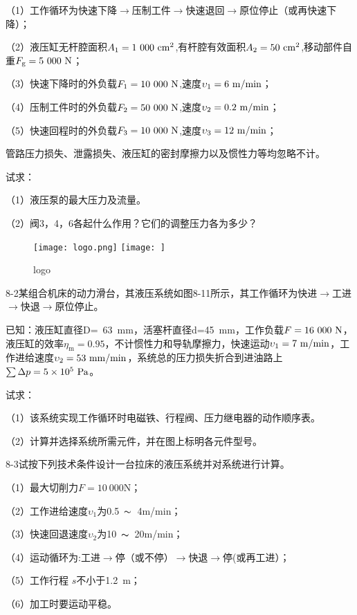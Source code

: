 \documentclass[cn,11pt,chinese]{elegantbook}
\begin{document}
（1）工作循环为快速下降$\rightarrow $压制工件$\rightarrow $快速退回$\rightarrow $原位停止（或再快速下降）；

（2）液压缸无杆腔面积$A_\text{1}=1\ 000\ \rm cm^2$,有杆腔有效面积$A_\text{2}=50\ \rm cm^2$,移动部件自重$F_\text{g}=5\ 000\ \rm N$；

（3）快速下降时的外负载$F_\text{1}=10\ 000\ \rm N$,速度$\upsilon_\text{1}=6\ \rm m/min$；

（4）压制工件时的外负载$F_\text{2}=50\ 000\ \rm N$,速度$\upsilon_\text{2}=0.2\ \rm m/min$；

（5）快速回程时的外负载$F_\text{3}=10\ 000\ \rm N$,速度$\upsilon_\text{3}=12\ \rm m/min$；

管路压力损失、泄露损失、液压缸的密封摩擦力以及惯性力等均忽略不计。

试求：

（1）液压泵的最大压力及流量。

（2）阀3，4，6各起什么作用？它们的调整压力各为多少？
\begin{figure}
\centering
\ifopensource
\texttt{[image: logo.png]}
\else
\texttt{[image: ]}
\fi
\caption{logo}
\label{}
\end{figure}
8-2\qquad 某组合机床的动力滑台，其液压系统如图8-11所示，其工作循环为快进$\rightarrow $工进$\rightarrow $快退$\rightarrow $原位停止。

已知：液压缸直径D=\ 63\ mm，活塞杆直径d=45\ mm，工作负载$F=16\ 000\ \rm N$，液压缸的效率$\eta_\text{m}=0.95$，不计惯性力和导轨摩擦力，快速运动$\upsilon_\text{1}=7\ \rm m/min$，工作进给速度$\upsilon_\text{2}=53\ \rm mm/min$，系统总的压力损失折合到进油路上$\sum \Delta p=5\times10^5\ \rm Pa$。

试求：

（1）该系统实现工作循环时电磁铁、行程阀、压力继电器的动作顺序表。

（2）计算并选择系统所需元件，并在图上标明各元件型号。

8-3\qquad 试按下列技术条件设计一台拉床的液压系统并对系统进行计算。

（1）最大切削力$F=10\ 000$N；

（2）工作进给速度$\upsilon_\text{1}$为0.5\ $\thicksim$\ 4m/min；

（3）快速回退速度$\upsilon_\text{2}$为10\ $\thicksim$\ 20m/min；

（4）运动循环为:工进$\rightarrow $停（或不停）$\rightarrow $快退$\rightarrow $停(或再工进）；

（5）工作行程 $s$不小于1.2\ m；

（6）加工时要运动平稳。
\end{document}

